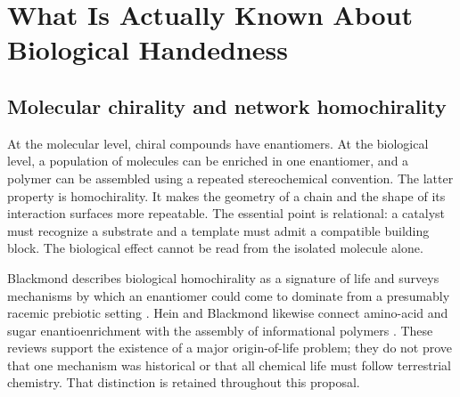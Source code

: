 \documentclass[conference]{IEEEtran}
\begin{document}
\section{What Is Actually Known About Biological Handedness}

\subsection{Molecular chirality and network homochirality}

At the molecular level, chiral compounds have enantiomers. At the biological level, a population of molecules can be enriched in one enantiomer, and a polymer can be assembled using a repeated stereochemical convention. The latter property is homochirality. It makes the geometry of a chain and the shape of its interaction surfaces more repeatable. The essential point is relational: a catalyst must recognize a substrate and a template must admit a compatible building block. The biological effect cannot be read from the isolated molecule alone.

Blackmond describes biological homochirality as a signature of life and surveys mechanisms by which an enantiomer could come to dominate from a presumably racemic prebiotic setting \cite{blackmond}. Hein and Blackmond likewise connect amino-acid and sugar enantioenrichment with the assembly of informational polymers \cite{hein}. These reviews support the existence of a major origin-of-life problem; they do not prove that one mechanism was historical or that all chemical life must follow terrestrial chemistry. That distinction is retained throughout this proposal.
\end{document}
